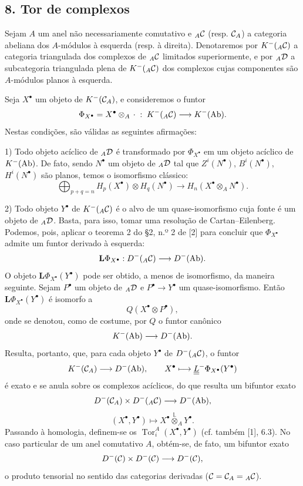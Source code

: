 \subsection*{8. Tor de complexos}

Sejam $A$ um anel não necessariamente comutativo e ${}_A\mathcal C$ (resp. $\mathcal C_A$) a categoria abeliana dos $A$-módulos à esquerda (resp. à direita). Denotaremos por $K^-({}_A\mathcal C)$ a categoria triangulada dos complexos de ${}_A\mathcal C$ limitados superiormente, e por ${}_A\mathcal D$ a subcategoria triangulada plena de $K^-({}_A\mathcal C)$ dos complexos cujas componentes são $A$-módulos planos à esquerda.

Seja $X^\bullet$ um objeto de $K^-(\mathcal C_A)$, e consideremos o funtor
\[
\Phi_{X^\bullet}=X^\bullet\otimes_A\,\cdot\;:\;K^-({}_A\mathcal C)\longrightarrow K^-(\operatorname{Ab}).
\]
Nestas condições, são válidas as seguintes afirmações:

1) Todo objeto acíclico de ${}_A\mathcal D$ é transformado por $\Phi_{X^\bullet}$ em um objeto acíclico de $K^-(\operatorname{Ab})$. De fato, sendo $N^\bullet$ um objeto de ${}_A\mathcal D$ tal que $Z^i(N^\bullet)$, $B^i(N^\bullet)$, $H^i(N^\bullet)$ são planos, temos o isomorfismo clássico:
\[
\bigoplus_{p+q=n}H_p(X^\bullet)\otimes H_q(N^\bullet)
\longrightarrow H_n(X^\bullet\otimes_A N^\bullet).
\]

2) Todo objeto $Y^\bullet$ de $K^-({}_A\mathcal C)$ é o alvo de um quase-isomorfismo cuja fonte é um objeto de ${}_A\mathcal D$. Basta, para isso, tomar uma resolução de Cartan--Eilenberg. Podemos, pois, aplicar o teorema 2 do §2, n.º 2 de [2] para concluir que $\Phi_{X^\bullet}$ admite um funtor derivado à esquerda:
\[
\mathbf L\Phi_{X^\bullet}:D^-({}_A\mathcal C)\longrightarrow D^-(\operatorname{Ab}).
\]
O objeto $\mathbf L\Phi_{X^\bullet}(Y^\bullet)$ pode ser obtido, a menos de isomorfismo, da maneira seguinte. Sejam $P^\bullet$ um objeto de ${}_A\mathcal D$ e $P^\bullet\to Y^\bullet$ um quase-isomorfismo. Então $\mathbf L\Phi_{X^\bullet}(Y^\bullet)$ é isomorfo a
\[
Q(X^\bullet\otimes P^\bullet),
\]
onde se denotou, como de costume, por $Q$ o funtor canônico
\[
K^-(\operatorname{Ab})\longrightarrow D^-(\operatorname{Ab}).
\]
Resulta, portanto, que, para cada objeto $Y^\bullet$ de $D^-({}_A\mathcal C)$, o funtor
\[
K^-(\mathcal C_A)\longrightarrow D^-(\operatorname{Ab}),\qquad
X^\bullet\longmapsto \underline{\underline L}^{-}\Phi_{X^\bullet}(Y^\bullet)
\]
é exato e se anula sobre os complexos acíclicos, do que resulta um bifuntor exato
\[
D^-(\mathcal C_A)\times D^-({}_A\mathcal C)\longrightarrow D^-(\operatorname{Ab}),
\]
\[
(X^\bullet,Y^\bullet)\longmapsto X^\bullet\overset{\mathbb L}{\otimes}_A Y^\bullet.
\]
Passando à homologia, definem-se os $\operatorname{Tor}_i^A(X^\bullet,Y^\bullet)$ (cf. também [1], 6.3). No caso particular de um anel comutativo $A$, obtém-se, de fato, um bifuntor exato
\[
D^-(\mathcal C)\times D^-(\mathcal C)\longrightarrow D^-(\mathcal C),
\]
o produto tensorial no sentido das categorias derivadas ($\mathcal C=\mathcal C_A={}_A\mathcal C$).
